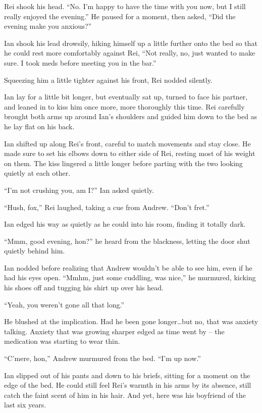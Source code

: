Rei shook his head. ``No. I'm happy to have the time with you now, but I still really enjoyed the evening.'' He paused for a moment, then asked, ``Did the evening make you anxious?''

Ian shook his lead drowsily, hiking himself up a little further onto the bed so that he could rest more comfortably against Rei, ``Not really, no, just wanted to make sure. I took meds before meeting you in the bar.''

Squeezing him a little tighter against his front, Rei nodded silently.

Ian lay for a little bit longer, but eventually sat up, turned to face his partner, and leaned in to kiss him once more, more thoroughly this time. Rei carefully brought both arms up around Ian's shoulders and guided him down to the bed as he lay flat on his back.

Ian shifted up along Rei's front, careful to match movements and stay close. He made sure to set his elbows down to either side of Rei, resting most of his weight on them. The kiss lingered a little longer before parting with the two looking quietly at each other.

``I'm not crushing you, am I?'' Ian asked quietly.

``Hush, fox,'' Rei laughed, taking a cue from Andrew. ``Don't fret.''

\secdiv

Ian edged his way as quietly as he could into his room, finding it totally dark.

``Mmm, good evening, hon?'' he heard from the blackness, letting the door shut quietly behind him.

Ian nodded before realizing that Andrew wouldn't be able to see him, even if he had his eyes open. ``Mmhm, just some cuddling, was nice,'' he murmured, kicking his shoes off and tugging his shirt up over his head.

``Yeah, you weren't gone all that long.''

He blushed at the implication. Had he been gone longer\ldots{}but no, that was anxiety talking. Anxiety that was growing sharper edged as time went by -- the medication was starting to wear thin.

``C'mere, hon,'' Andrew murmured from the bed. ``I'm up now.''

Ian slipped out of his pants and down to his briefs, sitting for a moment on the edge of the bed. He could still feel Rei's warmth in his arms by its absence, still catch the faint scent of him in his hair. And yet, here was his boyfriend of the last six years.

